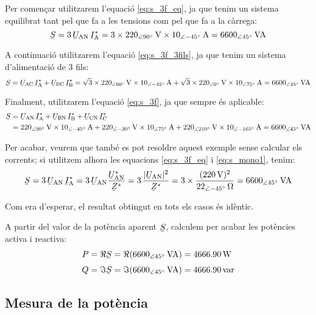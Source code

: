 \begin{exemple}[\PotSistTresFils{}]
    Per començar  utilitzarem l'equació \eqref{eq:s_3f_eq}, ja que tenim
    un sistema equilibrat tant pel que fa a les tensions com pel que fa a la càrrega:
    \[
    \cmplx{S} = 3\,\cmplx{U}\ped{AN} \,\cmplx{I}\ped{A}^* =
    3\times \qtypd{220}{90}{V} \times
    \qtypd{10}{-45}{A} = \qtypd{6600}{45}{VA}
    \]

    A continuació  utilitzarem l'equació \eqref{eq:s_3f_3fils}, ja que tenim
    un sistema d'alimentació de 3 fils:
    \[
    \cmplx{S} = \cmplx{U}\ped{AC} \,\cmplx{I}\ped{A}^*
     +  \cmplx{U}\ped{BC} \,\cmplx{I}\ped{B}^* =
    \sqrt{3}\times \qtypd{220}{60}{V} \times
    \qtypd{10}{-45}{A} + \sqrt{3}\times \qtypd{220}{0}{V}
    \times \qtypd{10}{75}{A}  = \qtypd{6600}{45}{VA}
    \]

     Finalment,  utilitzarem l'equació \eqref{eq:s_3f}, ja que
     sempre és aplicable:
     \[\begin{split}
     \cmplx{S} &=  \cmplx{U}\ped{AN} \,\cmplx{I}\ped{A}^* +
     \cmplx{U}\ped{BN} \,\cmplx{I}\ped{B}^* +  \cmplx{U}\ped{CN}\,
     \cmplx{I}\ped{C}^* \\
     &= \qtypd{220}{90}{V}
     \times \qtypd{10}{-45}{A} + \qtypd{220}{-30}{V} \times \qtypd{10}{75}{A}
     + \qtypd{220}{210}{V} \times \qtypd{10}{-165}{A} = \qtypd{6600}{45}{VA}
     \end{split} \]

    Per acabar, veurem que també es pot resoldre aquest exemple
    sense calcular els corrents; si utilitzem alhora les
    equacions \eqref{eq:s_3f_eq} i \eqref{eq:s_mono1}, tenim:
    \[
    \cmplx{S} = 3\,\cmplx{U}\ped{AN} \,\cmplx{I}\ped{A}^* =
    3\,\cmplx{U}\ped{AN}\frac{\cmplx{U}\ped{AN}^*}{\cmplx{Z}^*} =
    3\, \frac{|\cmplx{U}\ped{AN}|^2}{\cmplx{Z}^*} =
    3 \times \frac{(\qty{220}{V})^2}{\qtypd{22}{-45}{\ohm}} =
    \qtypd{6600}{45}{VA}
    \]

    Com era d'esperar, el resultat obtingut en tots els casos
    és idèntic.

    A partir del valor de la potència aparent $\cmplx{S}$, calculem per acabar les potències activa i reactiva:
    \begin{align*}
        P &= \Re\cmplx{S} = \Re(\qtypd{6600}{45}{VA}) = \qty{4666,90}{W}\\[1mm]
        Q &= \Im\cmplx{S} = \Im(\qtypd{6600}{45}{VA}) = \qty{4666,90}{var}
    \end{align*}

\end{exemple}

\subsection{Mesura de la potència}

